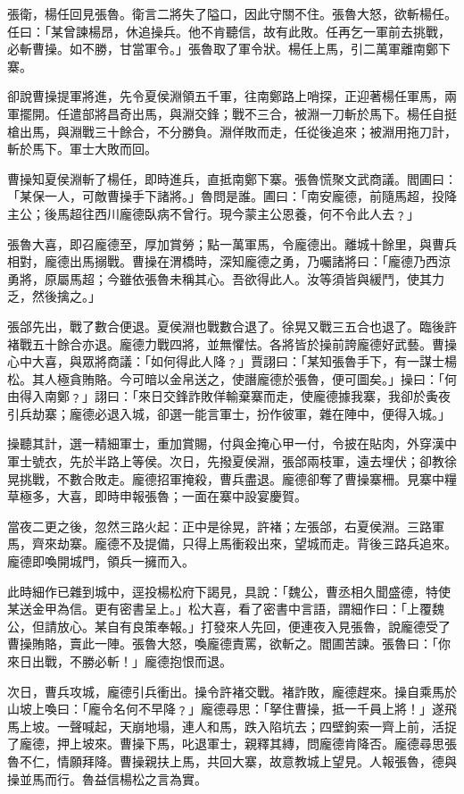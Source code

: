 張衛，楊任回見張魯。衛言二將失了隘口，因此守關不住。張魯大怒，欲斬楊任。任曰：「某曾諫楊昂，休追操兵。他不肯聽信，故有此敗。任再乞一軍前去挑戰，必斬曹操。如不勝，甘當軍令。」張魯取了軍令狀。楊任上馬，引二萬軍離南鄭下寨。

卻說曹操提軍將進，先令夏侯淵領五千軍，往南鄭路上哨探，正迎著楊任軍馬，兩軍擺開。任遣部將昌奇出馬，與淵交鋒；戰不三合，被淵一刀斬於馬下。楊任自挺槍出馬，與淵戰三十餘合，不分勝負。淵佯敗而走，任從後追來；被淵用拖刀計，斬於馬下。軍士大敗而回。

曹操知夏侯淵斬了楊任，即時進兵，直抵南鄭下寨。張魯慌聚文武商議。閻圃曰：「某保一人，可敵曹操手下諸將。」魯問是誰。圃曰：「南安龐德，前隨馬超，投降主公；後馬超往西川龐德臥病不曾行。現今蒙主公恩養，何不令此人去﹖」

張魯大喜，即召龐德至，厚加賞勞；點一萬軍馬，令龐德出。離城十餘里，與曹兵相對，龐德出馬搦戰。曹操在渭橋時，深知龐德之勇，乃囑諸將曰：「龐德乃西涼勇將，原屬馬超；今雖依張魯未稱其心。吾欲得此人。汝等須皆與緩鬥，使其力乏，然後擒之。」

張郃先出，戰了數合便退。夏侯淵也戰數合退了。徐晃又戰三五合也退了。臨後許褚戰五十餘合亦退。龐德力戰四將，並無懼怯。各將皆於操前誇龐德好武藝。曹操心中大喜，與眾將商議：「如何得此人降﹖」賈詡曰：「某知張魯手下，有一謀士楊松。其人極貪賄賂。今可暗以金帛送之，使譖龐德於張魯，便可圖矣。」操曰：「何由得入南鄭﹖」詡曰：「來日交鋒詐敗佯輸棄寨而走，使龐德據我寨，我卻於夤夜引兵劫寨；龐德必退入城，卻選一能言軍士，扮作彼軍，雜在陣中，便得入城。」

操聽其計，選一精細軍士，重加賞賜，付與金掩心甲一付，令披在貼肉，外穿漢中軍士號衣，先於半路上等侯。次日，先撥夏侯淵，張郃兩枝軍，遠去埋伏；卻教徐晃挑戰，不數合敗走。龐德招軍掩殺，曹兵盡退。龐德卻奪了曹操寨柵。見寨中糧草極多，大喜，即時申報張魯；一面在寨中設宴慶賀。

當夜二更之後，忽然三路火起：正中是徐晃，許褚；左張郃，右夏侯淵。三路軍馬，齊來劫寨。龐德不及提備，只得上馬衝殺出來，望城而走。背後三路兵追來。龐德即喚開城門，領兵一擁而入。

此時細作已雜到城中，逕投楊松府下謁見，具說：「魏公，曹丞相久聞盛德，特使某送金甲為信。更有密書呈上。」松大喜，看了密書中言語，謂細作曰：「上覆魏公，但請放心。某自有良策奉報。」打發來人先回，便連夜入見張魯，說龐德受了曹操賄賂，賣此一陣。張魯大怒，喚龐德責罵，欲斬之。閻圃苦諫。張魯曰：「你來日出戰，不勝必斬！」龐德抱恨而退。

次日，曹兵攻城，龐德引兵衝出。操令許褚交戰。褚詐敗，龐德趕來。操自乘馬於山坡上喚曰：「龐令名何不早降﹖」龐德尋思：「拏住曹操，抵一千員上將！」遂飛馬上坡。一聲喊起，天崩地塌，連人和馬，跌入陷坑去；四壁鉤索一齊上前，活捉了龐德，押上坡來。曹操下馬，叱退軍士，親釋其縳，問龐德肯降否。龐德尋思張魯不仁，情願拜降。曹操親扶上馬，共回大寨，故意教城上望見。人報張魯，德與操並馬而行。魯益信楊松之言為實。

